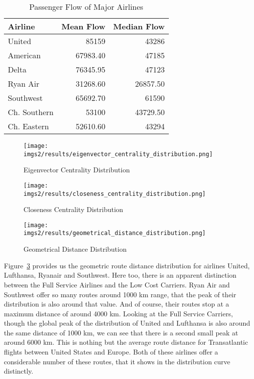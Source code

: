\documentclass[twocolumn]{tum-article}
\begin{document}
\begin{table}[ht]
\begin{center}
 \begin{tabular}{| l | r | r |}
 \hline
 \textbf{Airline} & \textbf{Mean Flow} & \textbf{Median Flow} \\ 
 \hline
 United & 85159 & 43286 \\
 \hline
 American & 67983.40 & 47185 \\
 \hline
 Delta & 76345.95  & 47123 \\
 \hline
 Ryan Air & 31268.60 & 26857.50 \\
 \hline
 Southwest & 65692.70  & 61590 \\
 \hline
 Ch. Southern & 53100  & 43729.50 \\
 \hline
 Ch. Eastern & 52610.60  & 43294 \\
 \hline
 \end{tabular}
\caption{Passenger Flow of Major Airlines}
\label{Tab:passenger_flow_airlines}
\end{center}
\end{table}

\begin{figure}
        \centering
        \texttt{[image: imgs2/results/eigenvector\_centrality\_distribution.png]}
        \caption{
Eigenvector Centrality Distribution}
        \label{fig:eigen_distr}
\end{figure}

\begin{figure}
        \centering
        \texttt{[image: imgs2/results/closeness\_centrality\_distribution.png]}
        \caption{
Closeness Centrality Distribution}
        \label{fig:closeness_distr}
\end{figure}


\begin{figure}
        \centering
        \texttt{[image: imgs2/results/geometrical\_distance\_distribution.png]}
        \caption{
Geometrical Distance Distribution}
        \label{fig:geometric_distr}
\end{figure}

Figure~\ref{fig:geometric_distr} provides us the geometric route distance distribution for airlines United, Lufthansa, Ryanair and Southwest. Here too, there is an apparent distinction between the Full Service Airlines and the Low Cost Carriers. 	
Ryan Air and Southwest offer so many routes around 1000 km range, that the peak of their distribution is also around that value.
And of course, their routes stop at a maximum distance of around 4000 km. 
Looking at the Full Service Carriers, though the global peak of the distribution of United and Lufthansa is also around the same distance of 1000 km, we can see that there is a second small peak at around 6000 km. This is nothing but the average route distance for Transatlantic flights between United States and Europe. 
Both of these airlines offer a considerable number of these routes, that it shows in the distribution curve distinctly. 
\end{document}
